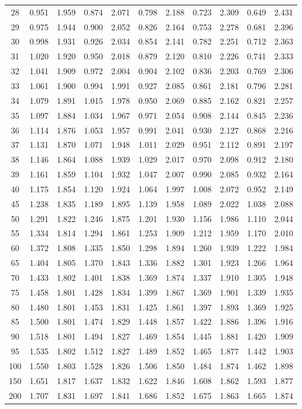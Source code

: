 \documentclass[12pt]{article}
\begin{document}
\begin{table}
\begin{center}
{\begin{tabular}{|c|c|c|c|c|c|c|c|c|c|c|}
	28&0.951&1.959&0.874&2.071&0.798&2.188&0.723&2.309&0.649&2.431\\
	29&0.975&1.944&0.900&2.052&0.826&2.164&0.753&2.278&0.681&2.396\\
	30&0.998&1.931&0.926&2.034&0.854&2.141&0.782&2.251&0.712&2.363\\
	31&1.020&1.920&0.950&2.018&0.879&2.120&0.810&2.226&0.741&2.333\\
	32&1.041&1.909&0.972&2.004&0.904&2.102&0.836&2.203&0.769&2.306\\
	33&1.061&1.900&0.994&1.991&0.927&2.085&0.861&2.181&0.796&2.281\\
	34&1.079&1.891&1.015&1.978&0.950&2.069&0.885&2.162&0.821&2.257\\
	35&1.097&1.884&1.034&1.967&0.971&2.054&0.908&2.144&0.845&2.236\\
	36&1.114&1.876&1.053&1.957&0.991&2.041&0.930&2.127&0.868&2.216\\
	37&1.131&1.870&1.071&1.948&1.011&2.029&0.951&2.112&0.891&2.197\\
	38&1.146&1.864&1.088&1.939&1.029&2.017&0.970&2.098&0.912&2.180\\
	39&1.161&1.859&1.104&1.932&1.047&2.007&0.990&2.085&0.932&2.164\\
	40&1.175&1.854&1.120&1.924&1.064&1.997&1.008&2.072&0.952&2.149\\
	45&1.238&1.835&1.189&1.895&1.139&1.958&1.089&2.022&1.038&2.088\\
	50&1.291&1.822&1.246&1.875&1.201&1.930&1.156&1.986&1.110&2.044\\
	55&1.334&1.814&1.294&1.861&1.253&1.909&1.212&1.959&1.170&2.010\\
	60&1.372&1.808&1.335&1.850&1.298&1.894&1.260&1.939&1.222&1.984\\
	65&1.404&1.805&1.370&1.843&1.336&1.882&1.301&1.923&1.266&1.964\\
	70&1.433&1.802&1.401&1.838&1.369&1.874&1.337&1.910&1.305&1.948\\
	75&1.458&1.801&1.428&1.834&1.399&1.867&1.369&1.901&1.339&1.935\\
	80&1.480&1.801&1.453&1.831&1.425&1.861&1.397&1.893&1.369&1.925\\
	85&1.500&1.801&1.474&1.829&1.448&1.857&1.422&1.886&1.396&1.916\\
	90&1.518&1.801&1.494&1.827&1.469&1.854&1.445&1.881&1.420&1.909\\
	95&1.535&1.802&1.512&1.827&1.489&1.852&1.465&1.877&1.442&1.903\\
	100&1.550&1.803&1.528&1.826&1.506&1.850&1.484&1.874&1.462&1.898\\
	150&1.651&1.817&1.637&1.832&1.622&1.846&1.608&1.862&1.593&1.877\\
	200&1.707&1.831&1.697&1.841&1.686&1.852&1.675&1.863&1.665&1.874\\
	\hline
\end{tabular}
}
\end{center}
\end{table}
\end{document}
